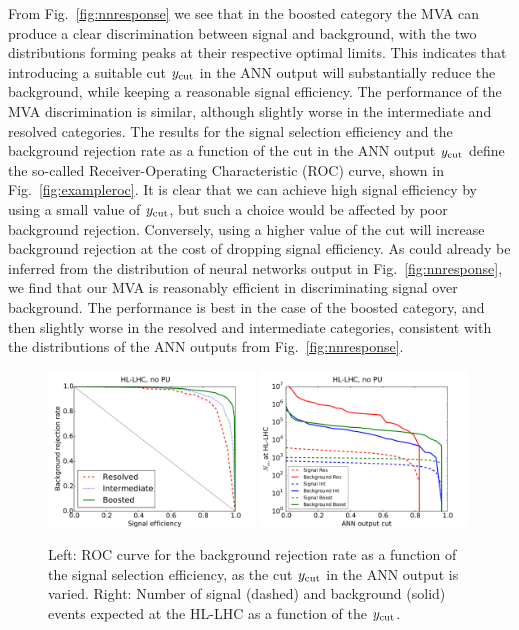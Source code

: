 From Fig.~\ref{fig:nnresponse} we see that in the boosted category the MVA can produce
a clear discrimination between signal and background, with the two distributions
forming peaks at their respective optimal limits.
%
This indicates that introducing a suitable cut
$y_{\rm cut}$
in the ANN output will substantially reduce the background,
while keeping a reasonable signal efficiency.
%
The performance of the MVA discrimination is similar, although slightly worse in the intermediate
and resolved categories.
%
The results for the signal selection efficiency and the 
background rejection rate as a function of the cut in the ANN output
$y_{\rm cut}$
define the so-called  Receiver-Operating Characteristic (ROC)
curve, shown in Fig.~\ref{fig:exampleroc}.
%
It is clear that we can achieve  high signal efficiency by using
a small value of $y_{\rm cut}$, but such a choice would be
affected by poor background
rejection.
%
Conversely, using a higher value of the cut will increase background rejection at the
cost of dropping signal efficiency.
%
As could already be inferred from the distribution of neural
networks output in Fig.~\ref{fig:nnresponse}, we find
that our MVA is reasonably efficient
in discriminating signal over background.
%
The performance is best in the case of the boosted category,
and then slightly worse in the resolved
and intermediate categories, consistent with the distributions of
the ANN outputs from
Fig.~\ref{fig:nnresponse}.
%

\begin{figure}[t]
\begin{center}
  \includegraphics[width=0.49\textwidth]{plots/roc_noPU.pdf}
  \includegraphics[width=0.49\textwidth]{plots/nev2_noPU.pdf}
\caption{\small Left: ROC curve for the background rejection rate as a function of the signal
  selection efficiency, as the cut $y_{\rm cut}$
  in the ANN output is varied.
  Right: Number of signal (dashed) and background (solid)
  events expected at the HL-LHC as a function of the $y_{\rm cut}$.
}
\label{fig:exampleroc}
\label{fig:nev2}
\end{center}
\end{figure}


